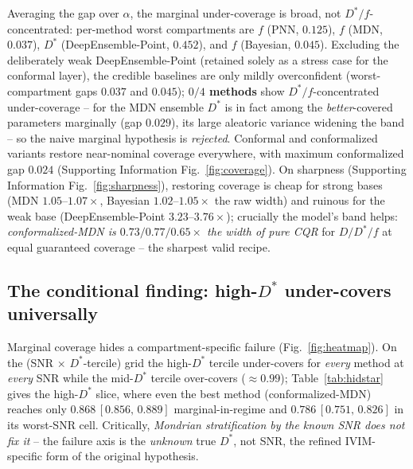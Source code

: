 \documentclass[11pt]{article}
\newcommand{\Dstar}{D^{*}}
\newcommand{\band}[2]{{\scriptsize\,$[#1,\,#2]$}}
\begin{document}
Averaging the gap over $\alpha$, the marginal under-coverage is broad, not
$\Dstar/f$-concentrated: per-method worst compartments are $f$ (PNN, $0.125$), $f$
(MDN, $0.037$), $\Dstar$ (DeepEnsemble-Point, $0.452$), and $f$ (Bayesian, $0.045$).
Excluding the deliberately weak DeepEnsemble-Point (retained solely as a stress case
for the conformal layer), the credible baselines are only mildly overconfident
(worst-compartment gaps $0.037$ and $0.045$); \textbf{$0/4$ methods} show
$\Dstar/f$-concentrated under-coverage -- for the MDN ensemble $\Dstar$ is in fact
among the \emph{better}-covered parameters marginally (gap $0.029$), its large
aleatoric variance widening the band -- so the naive marginal hypothesis is
\emph{rejected}. Conformal and conformalized variants restore near-nominal coverage
everywhere, with maximum conformalized gap $0.024$ (Supporting Information
Fig.~\ref{fig:coverage}). On sharpness (Supporting Information
Fig.~\ref{fig:sharpness}), restoring coverage is cheap for strong bases (MDN
$1.05$--$1.07\times$, Bayesian $1.02$--$1.05\times$ the raw width) and ruinous for the
weak base (DeepEnsemble-Point $3.23$--$3.76\times$); crucially the model's band helps:
\emph{conformalized-MDN is $0.73/0.77/0.65\times$ the width of pure CQR} for
$D/\Dstar/f$ at equal guaranteed coverage -- the sharpest valid recipe.

\subsection{The conditional finding: high-$\Dstar$ under-covers universally}
\label{sec:conditional}
Marginal coverage hides a compartment-specific failure (Fig.~\ref{fig:heatmap}). On
the (SNR $\times$ $\Dstar$-tercile) grid the high-$\Dstar$ tercile under-covers for
\emph{every} method at \emph{every} SNR while the mid-$\Dstar$ tercile over-covers
($\approx0.99$); Table~\ref{tab:hidstar} gives the high-$\Dstar$ slice, where even the
best method (conformalized-MDN) reaches only $0.868$\band{0.856}{0.889}
marginal-in-regime and $0.786$\band{0.751}{0.826} in its worst-SNR cell. Critically,
\emph{Mondrian stratification by the known SNR does not fix it} -- the failure axis is
the \emph{unknown} true $\Dstar$, not SNR, the refined IVIM-specific form of the
original hypothesis.
\end{document}
